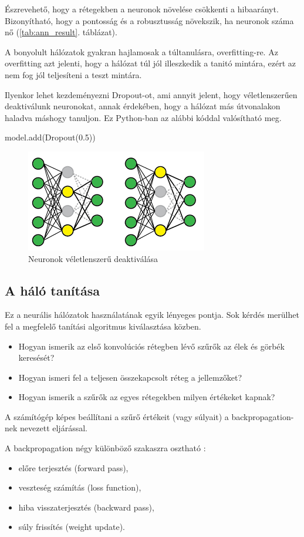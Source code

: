 Észrevehető, hogy a rétegekben a neuronok növelése csökkenti a hibaarányt. Bizonyítható, hogy a pontosság és a robusztusság növekszik, ha neuronok száma nő (\ref{tab:ann_result}. táblázat).

A bonyolult hálózatok gyakran hajlamosak a túltanulásra, overfitting-re. Az overfitting azt jelenti, hogy a hálózat túl jól illeszkedik a tanitó mintára, ezért az nem fog jól teljesíteni a teszt mintára.

Ilyenkor lehet kezdeményezni Dropout-ot, ami annyit jelent, hogy véletlenszerűen deaktiválunk neuronokat, annak érdekében, hogy a hálózat más útvonalakon haladva máshogy tanuljon. Ez Python-ban az alábbi kóddal valósítható meg.
\begin{python}
model.add(Dropout(0.5))
\end{python}

\begin{figure}[h]
\centering
\includegraphics[scale=0.8]{images/dropout}
\caption{Neuronok véletlenszerű deaktiválása}
\label{fig:dropout}
\end{figure} 

\subsection{A háló tanítása}

Ez a neurális hálózatok használatának egyik lényeges pontja. Sok kérdés merülhet fel a megfelelő tanítási algoritmus kiválasztása közben.
\begin{itemize}
\item Hogyan ismerik az első konvolúciós rétegben lévő szűrők az élek és görbék keresését?
\item Hogyan ismeri fel a teljesen összekapcsolt réteg a jellemzőket?
\item Hogyan ismerik a szűrők az egyes rétegekben milyen értékeket kapnak?
\end{itemize}
A számítógép képes beállítani a szűrő értékeit (vagy súlyait) a backpropagation-nek nevezett eljárással.

A backpropagation négy különböző szakaszra osztható \cite{ABeginne32}:
\begin{itemize}
\item előre terjesztés (forward pass),
\item veszteség számítás (loss function),
\item hiba visszaterjesztés (backward pass),
\item súly frissítés (weight update).
\end{itemize}

